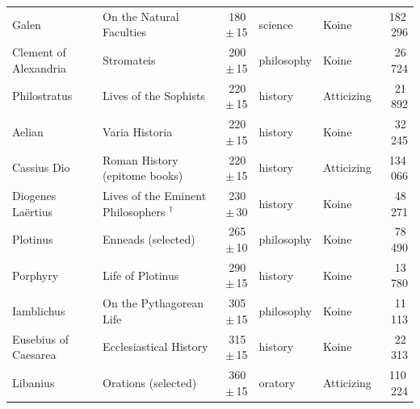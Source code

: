 \begin{longtable}{p{2.6cm}p{4.1cm}rll r}
Galen & On the Natural Faculties & 180\,$\pm$\,15 & science & Koine & 182\,296 \\
Clement of Alexandria & Stromateis & 200\,$\pm$\,15 & philosophy & Koine & 26\,724 \\
Philostratus & Lives of the Sophists & 220\,$\pm$\,15 & history & Atticizing & 21\,892 \\
Aelian & Varia Historia & 220\,$\pm$\,15 & history & Koine & 32\,245 \\
Cassius Dio & Roman History (epitome books) & 220\,$\pm$\,15 & history & Atticizing & 134\,066 \\
Diogenes Laërtius & Lives of the Eminent Philosophers $^{\dagger}$ & 230\,$\pm$\,30 & history & Koine & 48\,271 \\
Plotinus & Enneads (selected) & 265\,$\pm$\,10 & philosophy & Koine & 78\,490 \\
Porphyry & Life of Plotinus & 290\,$\pm$\,15 & history & Koine & 13\,780 \\
Iamblichus & On the Pythagorean Life & 305\,$\pm$\,15 & philosophy & Koine & 11\,113 \\
Eusebius of Caesarea & Ecclesiastical History & 315\,$\pm$\,15 & history & Koine & 22\,313 \\
Libanius & Orations (selected) & 360\,$\pm$\,15 & oratory & Atticizing & 110\,224 \\
\end{longtable}
\endgroup
